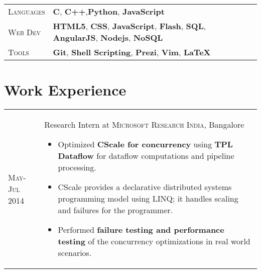 \documentclass[a4paper,10pt]{article} %
\begin{document}
\begin{tabular}{>{\raggedleft}p{2.2cm}p{15cm}}

    \textsc{Languages} %
            & \textbf{C}, \textbf{C++},\textbf{Python}, \textbf{JavaScript} \\
    \textsc{Web Dev} %
            & \textbf{HTML5}, \textbf{CSS}, \textbf{JavaScript}, \textbf{Flash}, \textbf{SQL},
              \textbf{AngularJS}, \textbf{Nodejs}, \textbf{NoSQL}\\
    \textsc{Tools} %
            & \textbf{Git}, \textbf{Shell Scripting}, \textbf{Prezi}, \textbf{Vim}, \textbf{LaTeX}\\

\end{tabular}


\section{Work Experience}

\begin{tabular}{>{\raggedleft}p{2.2cm}|p{15cm}}
    \textsc{May-Jul 2014} & Research Intern at \textsc{Microsoft Research India}, Bangalore
                            \footnotesize{
                                \begin{itemize}[leftmargin=*]
                                    \item Optimized \textbf{CScale for concurrency} using \textbf{TPL Dataflow}
                                        for dataflow computations and pipeline processing.
                                    \item CScale provides a declarative distributed systems programming
                                        model using LINQ; it handles scaling and failures for the programmer.
                                    \item Performed \textbf{failure testing and performance testing}
                                        of the concurrency optimizations in real world scenarios.
                                \end{itemize}
                            }\\
\end{tabular}
\end{document}
